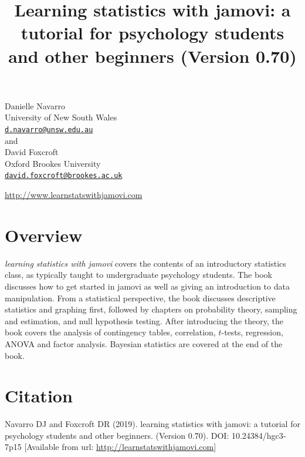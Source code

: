 \documentclass[
]{book}
\title{Learning statistics with jamovi: a tutorial for psychology students and other beginners (Version 0.70)}
\author{}
\date{\vspace{-2.5em}}
\begin{document}
\maketitle

{
\setcounter{tocdepth}{1}
\tableofcontents
}
\hypertarget{section}{%
\chapter*{}\label{section}}

Danielle Navarro\\
University of New South Wales\\
\href{mailto:d.navarro@unsw.edu.au}{\nolinkurl{d.navarro@unsw.edu.au}}\\

\hfill\break
and\\

David Foxcroft\\
Oxford Brookes University\\
\href{mailto:david.foxcroft@brookes.ac.uk}{\nolinkurl{david.foxcroft@brookes.ac.uk}}

\hfill\break
\url{http://www.learnstatswithjamovi.com}

\hypertarget{overview}{%
\chapter*{Overview}\label{overview}}

\emph{learning statistics with jamovi} covers the contents of an introductory statistics class, as typically taught to undergraduate psychology students. The book discusses how to get started in jamovi as well as giving an introduction to data manipulation. From a statistical perspective, the book discusses descriptive statistics and graphing first, followed by chapters on probability theory, sampling and estimation, and null hypothesis testing. After introducing the theory, the book covers the analysis of contingency tables, correlation, \(t\)-tests, regression, ANOVA and factor analysis. Bayesian statistics are covered at the end of the book.

\hypertarget{citation}{%
\chapter*{Citation}\label{citation}}

Navarro DJ and Foxcroft DR (2019). learning statistics with jamovi: a tutorial for psychology students and other beginners. (Version 0.70). DOI: 10.24384/hgc3-7p15 {[}Available from url: \url{http://learnstatswithjamovi.com}{]}
\end{document}
